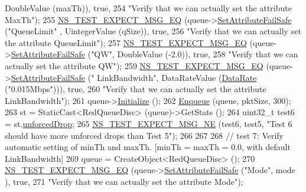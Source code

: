 \begin{DoxyCode}
      DoubleValue (maxTh)), \textcolor{keyword}{true},
254                          \textcolor{stringliteral}{"Verify that we can actually set the attribute MaxTh"});
255   \hyperlink{group__testing_ga7304ba46a28d8cf08dfdfd6499cf7068}{NS\_TEST\_EXPECT\_MSG\_EQ} (queue->\hyperlink{classns3_1_1ObjectBase_aa7d333004e970f925a4ed5df275541b5}{SetAttributeFailSafe} (\textcolor{stringliteral}{"QueueLimit"}
      , UintegerValue (qSize)), \textcolor{keyword}{true},
256                          \textcolor{stringliteral}{"Verify that we can actually set the attribute QueueLimit"});
257   \hyperlink{group__testing_ga7304ba46a28d8cf08dfdfd6499cf7068}{NS\_TEST\_EXPECT\_MSG\_EQ} (queue->\hyperlink{classns3_1_1ObjectBase_aa7d333004e970f925a4ed5df275541b5}{SetAttributeFailSafe} (\textcolor{stringliteral}{"QW"}, 
      DoubleValue (-2.0)), \textcolor{keyword}{true},
258                          \textcolor{stringliteral}{"Verify that we can actually set the attribute QW"});
259   \hyperlink{group__testing_ga7304ba46a28d8cf08dfdfd6499cf7068}{NS\_TEST\_EXPECT\_MSG\_EQ} (queue->\hyperlink{classns3_1_1ObjectBase_aa7d333004e970f925a4ed5df275541b5}{SetAttributeFailSafe} (\textcolor{stringliteral}{"
      LinkBandwidth"}, DataRateValue (\hyperlink{classns3_1_1DataRate}{DataRate} (\textcolor{stringliteral}{"0.015Mbps"}))), \textcolor{keyword}{true},
260                          \textcolor{stringliteral}{"Verify that we can actually set the attribute LinkBandwidth"});
261   queue->\hyperlink{classns3_1_1Object_af4411cb29971772fcd09203474a95078}{Initialize} ();
262   \hyperlink{classAredQueueDiscTestCase_a5528c44233e1056913e76d5be988f049}{Enqueue} (queue, pktSize, 300);
263   st = StaticCast<RedQueueDisc> (queue)->GetStats ();
264   uint32\_t test6 = st.\hyperlink{structns3_1_1RedQueueDisc_1_1Stats_a242027f6eb7d30e2cd636c52080e2c73}{unforcedDrop};
265   \hyperlink{group__testing_ga6d4b162d26b8a930115b97dd5f3d9ed9}{NS\_TEST\_EXPECT\_MSG\_NE} (test6, test5, \textcolor{stringliteral}{"Test 6 should have more unforced drops than
       Test 5"});
266 
267 
268   \textcolor{comment}{// test 7: Verify automatic setting of minTh and maxTh. [minTh = maxTh = 0.0, with default LinkBandwidth]}
269   queue = CreateObject<RedQueueDisc> ();
270   \hyperlink{group__testing_ga7304ba46a28d8cf08dfdfd6499cf7068}{NS\_TEST\_EXPECT\_MSG\_EQ} (queue->\hyperlink{classns3_1_1ObjectBase_aa7d333004e970f925a4ed5df275541b5}{SetAttributeFailSafe} (\textcolor{stringliteral}{"Mode"}, mode
      ), \textcolor{keyword}{true},
271                          \textcolor{stringliteral}{"Verify that we can actually set the attribute Mode"});

\end{DoxyCode}
